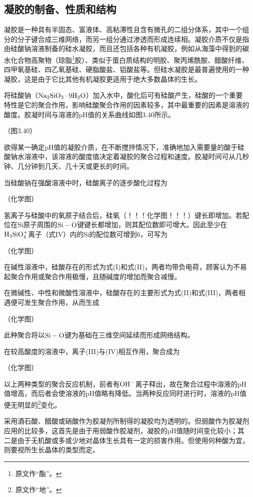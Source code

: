 \subsection{凝胶的制备、性质和结构}
凝胶是一种具有半固态、富液体、高粘滞性且含有微孔的二组分体系，其中一个组分的分子键合成三维网络，而另一组分通过渗透而形成连续相。凝胶介质不仅是指由硅酸钠溶液制备的硅水凝胶，而且还包括各种有机凝胶，例如从海藻中得到的碳水化合物高聚物（琼脂\footnote{原文作“酯”。}胶）、类似于蛋白质结构的明胶、聚丙烯酰胺、醋酸纤维、四甲氧基硅、四乙氧基硅、硬脂酸盐、铝酸盐等。但硅水凝胶是最普遍使用的一种凝胶，这是由于它比其他有机凝胶更适用于绝大多数晶体的生长。

将硅酸钠（$\rm Na_2SiO_3\cdot 9H_2O$）加入水中，酸化后可有硅酸产生，硅酸的一个重要特性是它的聚合作用，影响硅酸聚合作用的因素较多，其中最重要的因素是溶液的酸度。胶凝时间与溶液的pH值的关系曲线如图3.40所示。

（图3.40）

欲得某一确定pH值的凝胶介质，在不断搅拌情况下，准确地加入需要量的酸于硅酸钠水溶液中，该溶液的酸度值决定着凝胶的聚合过程和速度。胶凝时间可从几秒钟、几分钟到几天、几十天或更长的时间。

当硅酸钠在强酸溶液中时，硅酸离子的逐步酸化过程为

（化学图）

氢离子与硅酸中的氧原子结合后，硅氧（！！！化学图！！！）键长即增加。若配位在Si原子周围的$\rm Si-O$键键长都增加，则其配位数即可增大。因此至少在$\rm H_3SiO_4^+$离子（式IV）内的Si的配位数可增到6，可写为

（化学图）

在碱性溶液中，硅酸存在的形式为式(I)和式(II)，两者均带负电荷，顾客认为不易起聚合作用或聚合作用极慢，且随碱度的增加而聚合减慢。

在微碱性、中性和微酸性溶液中，硅酸存在的主要形式为式(II)和式(III)，两者相遇便可发生聚合作用，从而生成

（化学图）

此种聚合将以$\rm Si-O$键为基础在三维空间延续而形成网络结构。

在较高酸度的溶液中，离子(III)与(IV)相互作用，聚合成为

（化学图）

以上两种类型的聚合反应机制，前者有$\rm OH^-$离子释出，故在聚合过程中溶液的pH值增高，而后者会使溶液的pH值略有降低。当两种反应同时进行时，溶液的pH值便无明显的\footnote{原文作“地”。}变化。

采用酒石酸、醋酸或硝酸作为胶凝剂所制得的凝胶均为透明的。但弱酸作为胶凝剂应用的比较多，这首先是由于用弱酸作胶凝剂，凝胶的pH值随时间变化较小；其二是由于无机酸或多或少地对晶体生长具有一定的损害作用。但使用何种酸为宜，则要视所生长晶体的类型而定。

